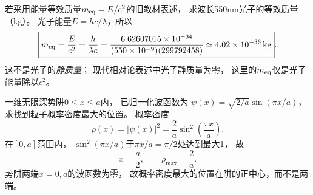 \problemtext 若采用能量等效质量$m_{\rm eq}=E/c^2$的旧教材表述，
求波长550nm光子的等效质量（kg）。
\workings
光子能量$E=hc/\lambda$，所以
\[
\boxed{m_{\rm eq}=\frac{E}{c^2}
=\frac{h}{\lambda c}
=\frac{6.62607015\times10^{-34}}
{(550\times10^{-9})(299792458)}
\simeq4.02\times10^{-36}\,\mathrm{kg}}.
\]
\crosscheck 这不是光子的\emph{静质量}；
现代相对论表述中光子静质量为零，
这里的$m_{\rm eq}$仅是光子能量除以$c^2$。

\problemtext 一维无限深势阱$0\le x\le a$内，
已归一化波函数为
$\psi(x)=\sqrt{2/a}\sin(\pi x/a)$，
求找到粒子概率密度最大的位置。
\workings
概率密度
\[
\rho(x)=|\psi(x)|^2
=\frac2a\sin^2\left(\frac{\pi x}{a}\right).
\]
在$[0,a]$范围内，
$\sin^2(\pi x/a)$于$\pi x/a=\pi/2$处达到最大1，
故
\[
\boxed{x=\frac a2},\qquad
\boxed{\rho_{\max}=\frac2a}.
\]
\crosscheck 势阱两端$x=0,a$的波函数为零，
故概率密度最大的位置在阱的正中心，而不是两端。
